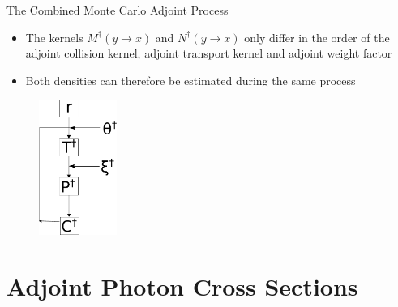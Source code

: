 \documentclass{beamer}
\begin{document}
\begin{frame}{The Combined Monte Carlo Adjoint Process}

  \begin{itemize}
    \item The kernels $M^{\dagger}(y \to x)$ and $N^{\dagger}(y \to x)$ only differ
      in the order of the adjoint collision kernel, adjoint transport kernel
      and adjoint weight factor
      \medskip
    \item Both densities can therefore be estimated during the same process
  \end{itemize}
  
  \begin{figure}[h!]
    \begin{center}
      \includegraphics[width=1.0in]{figures/adjoint_random_walk_process.pdf}
    \end{center}
  \end{figure}

\end{frame}

\section{Adjoint Photon Cross Sections}
\end{document}
